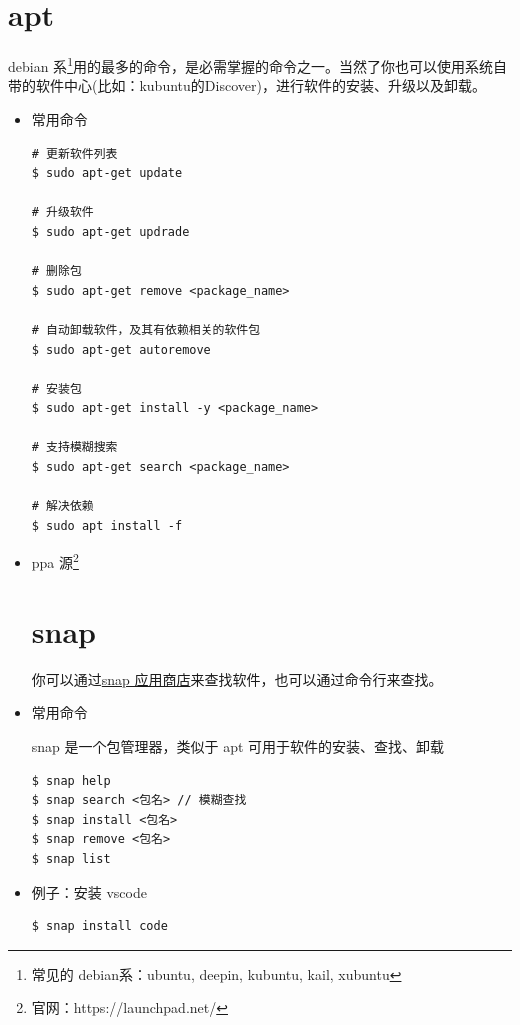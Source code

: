 \section{apt}
debian 系\footnote{常见的 debian系：ubuntu, deepin, kubuntu, kail, xubuntu}用的最多的命令，是必需掌握的命令之一。当然了你也可以使用系统自带的软件中心(比如：kubuntu的Discover)，进行软件的安装、升级以及卸载。
\begin{itemize}
\item 常用命令
\begin{lstlisting}
# 更新软件列表
$ sudo apt-get update 

# 升级软件
$ sudo apt-get updrade 

# 删除包
$ sudo apt-get remove <package_name>

# 自动卸载软件，及其有依赖相关的软件包
$ sudo apt-get autoremove 

# 安装包
$ sudo apt-get install -y <package_name>

# 支持模糊搜索  
$ sudo apt-get search <package_name> 

# 解决依赖
$ sudo apt install -f
\end{lstlisting}


\item ppa 源\footnote{官网：https://launchpad.net/}
\newpage
	
\section{snap}
你可以通过\href{https://snapcraft.io/}{snap 应用商店}来查找软件，也可以通过命令行来查找。

\item 常用命令

snap 是一个包管理器，类似于 apt 可用于软件的安装、查找、卸载
\begin{lstlisting}
$ snap help 
$ snap search <包名> // 模糊查找
$ snap install <包名>
$ snap remove <包名>
$ snap list 
\end{lstlisting}

\item 例子：安装 vscode 
\begin{lstlisting}
$ snap install code
\end{lstlisting}
\end{itemize}

